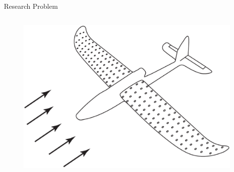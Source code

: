 \documentclass[aspectratio=169]{beamer}            %
\begin{document}
\begin{frame}{Research Problem}
\begin{columns}
\begin{column}{0.65\textwidth}
{				\begin{figure}[!htb]
	  			\centering
	  			\includegraphics[height=0.45\textwidth]{DistSensingUAV.eps}
				\end{figure}
			}
		\end{column}
	\end{columns}
	
\end{frame}
\end{document}
